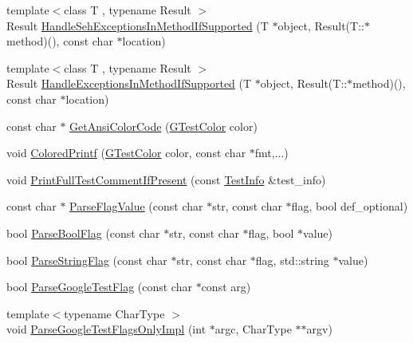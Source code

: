 \begin{DoxyCompactItemize}
{\footnotesize template$<$class T , typename Result $>$ }\\Result \hyperlink{namespacetesting_1_1internal_ac5293b438139ef7ed05cb7fcaaf63545}{Handle\+Seh\+Exceptions\+In\+Method\+If\+Supported} (T $\ast$object, Result(T\+::$\ast$method)(), const char $\ast$location)
\item 
{\footnotesize template$<$class T , typename Result $>$ }\\Result \hyperlink{namespacetesting_1_1internal_addb2ed165b92b74e25fe9ebe9e46b9f9}{Handle\+Exceptions\+In\+Method\+If\+Supported} (T $\ast$object, Result(T\+::$\ast$method)(), const char $\ast$location)
\item 
const char $\ast$ \hyperlink{namespacetesting_1_1internal_a0aefb9deb60e90f19c236559837303d8}{Get\+Ansi\+Color\+Code} (\hyperlink{namespacetesting_1_1internal_a648c1bc94c2ef9e868ff3f9dff0f9c4e}{G\+Test\+Color} color)
\item 
void \hyperlink{namespacetesting_1_1internal_adef3055706176001364e54eb73a87e31}{Colored\+Printf} (\hyperlink{namespacetesting_1_1internal_a648c1bc94c2ef9e868ff3f9dff0f9c4e}{G\+Test\+Color} color, const char $\ast$fmt,...)
\item 
void \hyperlink{namespacetesting_1_1internal_a7a85ebe3b4de93a1edb091f92f1fb393}{Print\+Full\+Test\+Comment\+If\+Present} (const \hyperlink{classtesting_1_1_test_info}{Test\+Info} \&test\+\_\+info)
\item 
const char $\ast$ \hyperlink{namespacetesting_1_1internal_a8bfd56af5e4a89bfb76f7e1723e41b03}{Parse\+Flag\+Value} (const char $\ast$str, const char $\ast$flag, bool def\+\_\+optional)
\item 
bool \hyperlink{namespacetesting_1_1internal_ada3b98e7cfe93f4ba2053c470d9e3e51}{Parse\+Bool\+Flag} (const char $\ast$str, const char $\ast$flag, bool $\ast$value)
\item 
bool \hyperlink{namespacetesting_1_1internal_aa4ce312efaaf7a97aac2303173afe021}{Parse\+String\+Flag} (const char $\ast$str, const char $\ast$flag, std\+::string $\ast$value)
\item 
bool \hyperlink{namespacetesting_1_1internal_afccff08aa2b1ede0dd32c1364a5dee42}{Parse\+Google\+Test\+Flag} (const char $\ast$const arg)
\item 
{\footnotesize template$<$typename Char\+Type $>$ }\\void \hyperlink{namespacetesting_1_1internal_ae4c46ce8c3d016848fff52cc5133f2ac}{Parse\+Google\+Test\+Flags\+Only\+Impl} (int $\ast$argc, Char\+Type $\ast$$\ast$argv)
\item 
$$
\end{DoxyCompactItemize}
